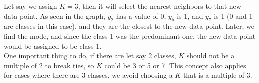 \begin{center}
\end{center}

Let say we assign $K = 3$, then it will select the nearest neighbors to that new data point.
As seen in the graph, $y_2$ has a value of 0, $y_5$ is 1, and $y_7$ is 1 (0 and 1 are classes in this case), and
they are the closest to the new data point. Later, we find the mode, and since the class 1 was the predominant one,
the new data point would be assigned to be class 1.\\
One important thing to do, if there are let say 2 classes, $K$ should not be a multiple of 2 to break ties, so $K$ could be
3 or 5 or 7. This concept also applies for cases where there are 3 classes, we avoid choosing a $K$ that is a multiple of 3.

